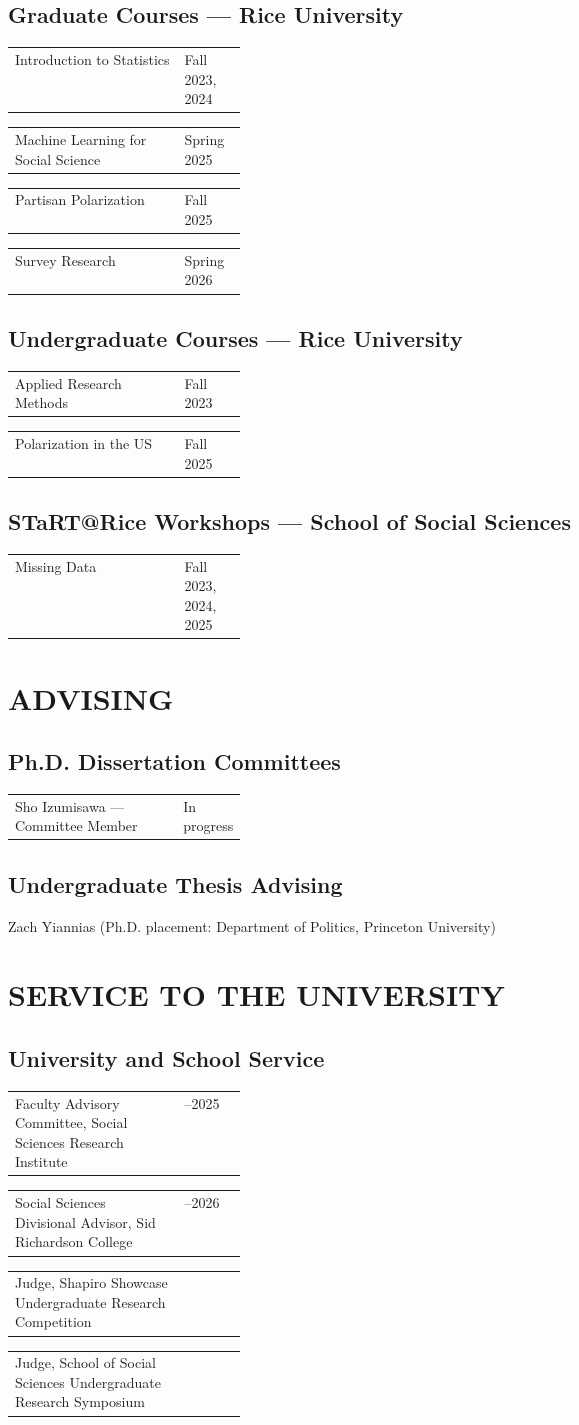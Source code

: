 \documentclass[11pt,a4paper]{article}
\makeatletter
\newcommand{\cvrow}[2]{%
  \noindent\begin{tabularx}{\linewidth}{@{}X>{\raggedleft\arraybackslash}p{0.27\linewidth}@{}}
  #1 & #2
  \end{tabularx}\par
}
\makeatother
\begin{document}
\subsection*{Graduate Courses --- Rice University}
\cvrow{Introduction to Statistics}{Fall 2023, 2024}
\cvrow{Machine Learning for Social Science}{Spring 2025}
\cvrow{Partisan Polarization}{Fall 2025}
\cvrow{Survey Research}{Spring 2026}

\subsection*{Undergraduate Courses --- Rice University}
\cvrow{Applied Research Methods}{Fall 2023}
\cvrow{Polarization in the US}{Fall 2025}

\subsection*{STaRT@Rice Workshops --- School of Social Sciences}
\cvrow{Missing Data}{Fall 2023, 2024, 2025}

\section{ADVISING}
\subsection*{Ph.D. Dissertation Committees}
\cvrow{Sho Izumisawa --- Committee Member}{In progress}

\subsection*{Undergraduate Thesis Advising}
Zach Yiannias (Ph.D. placement: Department of Politics, Princeton University)

\section{SERVICE TO THE UNIVERSITY}
\subsection*{University and School Service}
\cvrow{Faculty Advisory Committee, Social Sciences Research Institute}{2024--2025}
\cvrow{Social Sciences Divisional Advisor, Sid Richardson College}{2025--2026}
\cvrow{Judge, Shapiro Showcase Undergraduate Research Competition}{2025}
\cvrow{Judge, School of Social Sciences Undergraduate Research Symposium}{2024}
\end{document}
